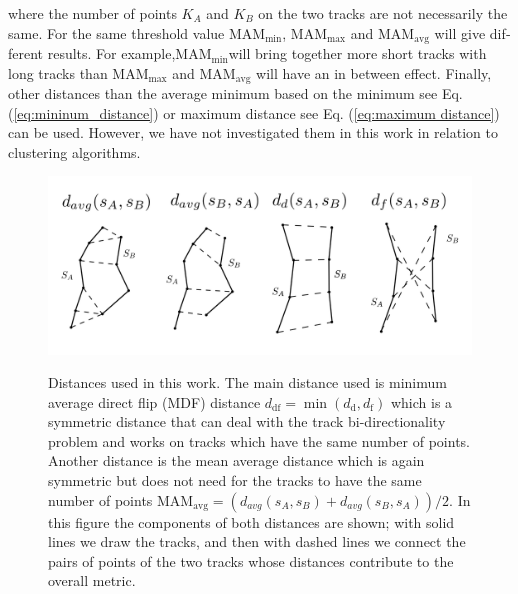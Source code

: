 \documentclass[preprint,authoryear,a4paper,10pt,onecolumn]{elsarticle}
\begin{document}
where the number of points $K_{A}$ and $K_{B}$ on the two tracks
are not necessarily the same. For the same threshold value $\textrm{MAM}_{\textrm{min}}$,
\foreignlanguage{british}{$\textrm{MAM}_{\textrm{max}}$ and $\textrm{MAM}_{\textrm{avg}}$
will give different results. For example,}$\textrm{MAM}_{\textrm{min}}$will
bring together more short tracks with long tracks than $\textrm{MAM}_{\textrm{max}}$
and \foreignlanguage{british}{$\textrm{MAM}_{\textrm{avg}}$} will
have an in between effect. Finally, other distances than the average
minimum based on the minimum see Eq. (\ref{eq:mininum_distance})
or maximum distance see Eq. (\ref{eq:maximum distance}) can be used.
However, we have not investigated them in this work in relation to
clustering algorithms.

%
\begin{figure}
\includegraphics[scale=0.6]{distances}

\centering{}\label{Flo:Distances_used}\caption{Distances used in this work. The main distance used is minimum average
direct flip (MDF) distance $d_{\textrm{df}}=\min(d_{\textrm{d}},d_{\textrm{f}})$
which is a symmetric distance that can deal with the track bi-directionality
problem and works on tracks which have the same number of points.
Another distance is the mean average distance which is again symmetric
but does not need for the tracks to have the same number of points
$\textrm{MAM}_{\textrm{avg}}=(d_{avg}(s_{A},s_{B})+d_{avg}(s_{B},s_{A}))/2$.
In this figure the components of both distances are shown; with solid
lines we draw the tracks, and then with dashed lines we connect the
pairs of points of the two tracks whose distances contribute to the
overall metric.}

\end{figure}
\end{document}
